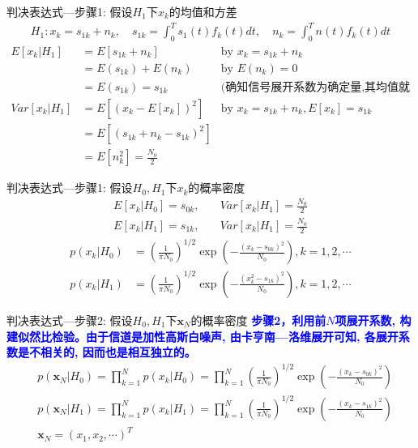 \begin{frame}[shrink]{判决表达式---步骤1: 假设$H_1$下$x_k$的均值和方差}
\begin{align*}
H_1: x_k=s_{1k}+n_k, \quad s_{1k}=\int_{0}^{T}s_1(t)f_k(t)dt, \quad n_k=\int_{0}^{T}n(t)f_k(t)dt
\end{align*}
\begin{align*}
E[x_k|H_1]&=E[s_{1k}+n_k]&\text{by }x_k=s_{1k}+n_k \\
&=E(s_{1k})+E(n_k)&\text{by }E(n_k)=0 \\
&=E(s_{1k})=s_{1k}&\text{(确知信号展开系数为确定量,其均值就是本身)}\\
Var[x_k|H_1]&=E[(x_k-E[x_k])^2]&\text{by }x_k=s_{1k}+n_k,E[x_k]=s_{1k}\\
&=E[(s_{1k}+n_k-s_{1k})^2]&\\
&=E[n_k^2]=\frac{N_0}{2}&
\end{align*}
\end{frame}

\begin{frame}[shrink]{判决表达式---步骤1: 假设$H_0,H_1$下$x_k$的概率密度}
\begin{align*}
E[x_k|H_0]=s_{0k},   &\quad Var[x_k|H_1]=\frac{N_0}{2}\\
E[x_k|H_1]=s_{1k}, &\quad Var[x_k|H_1]=\frac{N_0}{2}
\end{align*}
\begin{align*}
p(x_k|H_0)&=\left(\frac{1}{\pi N_0}\right)^{1/2}\exp\left(-\frac{(x_k-s_{0k})^2}{N_0}\right), k=1,2,\cdots\\
p(x_k|H_1)&=\left(\frac{1}{\pi N_0}\right)^{1/2}\exp\left(-\frac{(x_k^2-s_{1k})^2}{N_0}\right), k=1,2,\cdots
\end{align*}
\end{frame}

\begin{frame}[shrink]{判决表达式---步骤2: 假设$H_0,H_1$下$\bm{x}_N$的概率密度}
\textbf{\textcolor{blue}{步骤2，利用前$N$项展开系数, 构建似然比检验。由于信道是加性高斯白噪声, 由卡亨南---洛维展开可知, 各展开系数是不相关的, 因而也是相互独立的。}}
\begin{align*}
&p(\bm{x}_N|H_0)=\prod_{k=1}^{N}p(x_k|H_0)=\prod_{k=1}^{N}\left(\frac{1}{\pi N_0}\right)^{1/2}\exp\left(-\frac{(x_k-s_{0k})^2}{N_0}\right)\\
&p(\bm{x}_N|H_1)=\prod_{k=1}^{N}p(x_k|H_1)=\prod_{k=1}^{N}\left(\frac{1}{\pi N_0}\right)^{1/2}\exp\left(-\frac{(x_k-s_{1k})^2}{N_0}\right)\\
&\bm{x}_N=(x_1,x_2,\cdots)^T
\end{align*}	
\end{frame}

